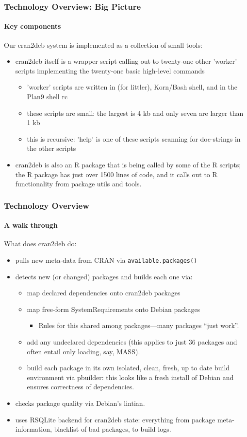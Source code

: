 \documentclass[smaller,compress]{beamer}
\begin{document}
\begin{frame}
  \frametitle{Technology Overview: Big Picture}
  \framesubtitle{Key components}

  Our cran2deb system is implemented as a collection of small tools:
  \begin{itemize}
  \item cran2deb itself is a wrapper script calling out to twenty-one other
    'worker' scripts implementing the twenty-one basic high-level commands
    \begin{itemize}
    \item 'worker' scripts are written in \R (for littler), Korn/Bash shell,
      and in the Plan9 shell rc
    \item these scripts are small: the largest is 4 kb and only seven
      are larger than 1 kb
    \item this is recursive: 'help' is one of these scripts scanning for
      doc-strings in the other scripts
    \end{itemize}
  \item cran2deb is also an R package that is being called by some of the R
    scripts; the R package has just over 1500 lines of code, and it calls out
    to R functionality from package utils and tools.
  \end{itemize}
\end{frame}  

\begin{frame}
  \frametitle{Technology Overview} 
  \framesubtitle{A walk through}

  What does cran2deb do:
  \begin{itemize}
  \item pulls new meta-data from CRAN via \texttt{available.packages()}
  \item detects new (or changed) packages and builds each one via:
    \begin{itemize}
    \item map declared \R dependencies onto cran2deb packages
    \item map free-form SystemRequirements onto Debian packages
      \begin{itemize}
      \item Rules for this shared among packages---many packages ``just work''.
      \end{itemize}
    \item add any undeclared dependencies (this applies to just 36 packages
      and often entail only loading, say, MASS).
    \item build each package in its own isolated, clean, fresh, up to date
      build environment via pbuilder: this looks like a fresh install of
      Debian and ensures correctness of dependencies. 
    \end{itemize}
  \item checks package quality via Debian's lintian.
  \item uses RSQLite backend for cran2deb state: everything from package
    meta-information, blacklist of bad packages, to build logs. 
  \end{itemize}
\end{frame}  
\end{document}
